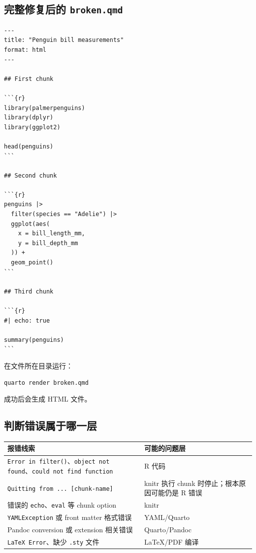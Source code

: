 \documentclass[11pt,a4paper]{ctexart}
\begin{document}
\subsection{完整修复后的 \texttt{broken.qmd}}

\begin{lstlisting}[style=textcode]
---
title: "Penguin bill measurements"
format: html
---

## First chunk

```{r}
library(palmerpenguins)
library(dplyr)
library(ggplot2)

head(penguins)
```

## Second chunk

```{r}
penguins |>
  filter(species == "Adelie") |>
  ggplot(aes(
    x = bill_length_mm,
    y = bill_depth_mm
  )) +
  geom_point()
```

## Third chunk

```{r}
#| echo: true

summary(penguins)
```
\end{lstlisting}

在文件所在目录运行：

\begin{lstlisting}[style=textcode]
quarto render broken.qmd
\end{lstlisting}

成功后会生成 HTML 文件。

\subsection{判断错误属于哪一层}

\begin{longtable}{p{}p{}}
\toprule
报错线索 & 可能的问题层 \\
\midrule
\endhead
\texttt{Error in filter()}、\texttt{object not found}、\texttt{could not find function} & R 代码 \\
\texttt{Quitting from ... [chunk-name]} & knitr 执行 chunk 时停止；根本原因可能仍是 R 错误 \\
错误的 \texttt{echo}、\texttt{eval} 等 chunk option & knitr \\
\texttt{YAMLException} 或 front matter 格式错误 & YAML/Quarto \\
Pandoc conversion 或 extension 相关错误 & Quarto/Pandoc \\
\texttt{LaTeX Error}、缺少 \texttt{.sty} 文件 & LaTeX/PDF 编译 \\
\bottomrule
\end{longtable}
\end{document}
